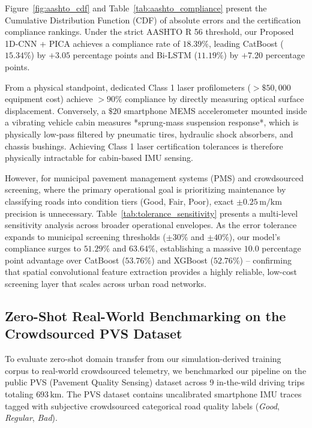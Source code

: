 \documentclass[conference]{IEEEtran}
\begin{document}
Figure~\ref{fig:aashto_cdf} and Table~\ref{tab:aashto_compliance} present the Cumulative Distribution Function (CDF) of absolute errors and the certification compliance rankings. Under the strict AASHTO R 56 threshold, our Proposed 1D-CNN + PICA achieves a compliance rate of $18.39\%$, leading CatBoost ($15.34\%$) by $+3.05$ percentage points and Bi-LSTM ($11.19\%$) by $+7.20$ percentage points. 

From a physical standpoint, dedicated Class 1 laser profilometers ($>\$50,000$ equipment cost) achieve $>90\%$ compliance by directly measuring optical surface displacement. Conversely, a $\$20$ smartphone MEMS accelerometer mounted inside a vibrating vehicle cabin measures *sprung-mass suspension response*, which is physically low-pass filtered by pneumatic tires, hydraulic shock absorbers, and chassis bushings. Achieving Class 1 laser certification tolerances is therefore physically intractable for cabin-based IMU sensing. 

However, for municipal pavement management systems (PMS) and crowdsourced screening, where the primary operational goal is prioritizing maintenance by classifying roads into condition tiers (Good, Fair, Poor), exact $\pm 0.25\,\text{m/km}$ precision is unnecessary. Table~\ref{tab:tolerance_sensitivity} presents a multi-level sensitivity analysis across broader operational envelopes. As the error tolerance expands to municipal screening thresholds ($\pm 30\%$ and $\pm 40\%$), our model's compliance surges to $51.29\%$ and $63.64\%$, establishing a massive $10.0$ percentage point advantage over CatBoost ($53.76\%$) and XGBoost ($52.76\%$) – confirming that spatial convolutional feature extraction provides a highly reliable, low-cost screening layer that scales across urban road networks.

\subsection{Zero-Shot Real-World Benchmarking on the Crowdsourced PVS Dataset}
\label{sec:eval_pvs}

To evaluate zero-shot domain transfer from our simulation-derived training corpus to real-world crowdsourced telemetry, we benchmarked our pipeline on the public PVS (Pavement Quality Sensing) dataset across 9 in-the-wild driving trips totaling $693\,\text{km}$. The PVS dataset contains uncalibrated smartphone IMU traces tagged with subjective crowdsourced categorical road quality labels (\textit{Good}, \textit{Regular}, \textit{Bad}).
\end{document}
